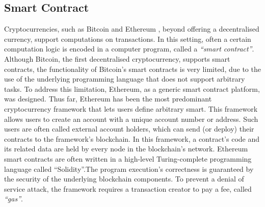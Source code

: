 %



\subsection{Smart Contract}\label{subsec:SC} Cryptocurrencies, such as Bitcoin \cite{bitcoin} and Ethereum \cite{ethereum}, beyond offering a decentralised currency,  support  computations on  transactions. In this setting, often a certain computation logic is encoded in a computer program, called a \emph{``smart contract''}. Although Bitcoin, the first decentralised cryptocurrency, supports smart contracts, the functionality of Bitcoin's smart contracts is very limited, due to the use of the underlying programming language that does not support arbitrary tasks. To address this limitation, Ethereum, as a generic smart contract platform, was designed. Thus far, Ethereum has been the most predominant cryptocurrency framework that lets users define arbitrary smart. This framework allows users to create an account with a unique account number or address. Such users are often called external account holders, which can send (or deploy) their contracts to the framework’s blockchain. In this framework, a contract's code and its related data  are held by every node in the blockchain's network. Ethereum smart contracts are often written in a high-level Turing-complete programming language called ``Solidity''.The program execution's  correctness  is  guaranteed by the security of the underlying blockchain components. To prevent  a denial of service attack, the framework requires a transaction creator to pay a  fee, called \emph{``gas''}. %



